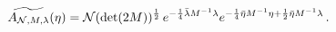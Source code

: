 \begin{equation}
\widetilde{A_{{\mathcal{N}},M,\lambda }}(\eta )=\mathcal{N}(\det (2M))^{%
\frac{1}{2}}\,e^{-{\frac{1}{4}}\bar{\lambda}M^{-1}\lambda }e^{-{\frac{1}{4}}%
\bar{\eta}M^{-1}\eta +{\frac{1}{2}}\bar{\eta}M^{-1}\lambda }\,.
\end{equation}

